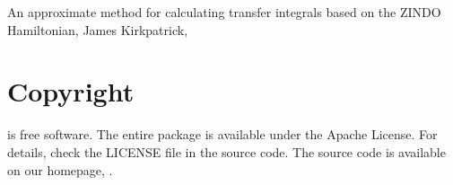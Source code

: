 \vspace{0.1cm}
\noindent
\cite{kirkpatrick_approximate_2008} An approximate method for calculating transfer integrals based on the ZINDO Hamiltonian, James Kirkpatrick, \\

\section*{Copyright}
\votcactp is free software. The entire package is available under the Apache License. For details, check
the LICENSE file in the source code. The \votcactp source code is available on our homepage, .

\vfill
